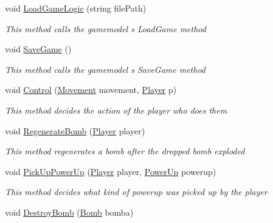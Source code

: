 \begin{DoxyCompactItemize}
void \mbox{\hyperlink{class_bomberman_1_1_business_logic_1_1_game_logic_a457b06be2502ed585fe15f6dcd5bc367}{Load\+Game\+Logic}} (string file\+Path)
\begin{DoxyCompactList}\small\item\em This method calls the gamemodel s Load\+Game method \end{DoxyCompactList}\item 
void \mbox{\hyperlink{class_bomberman_1_1_business_logic_1_1_game_logic_a8b8614ef81f7bf80f46384cc1f440ded}{Save\+Game}} ()
\begin{DoxyCompactList}\small\item\em This method calls the gamemodel s Save\+Game method \end{DoxyCompactList}\item 
void \mbox{\hyperlink{class_bomberman_1_1_business_logic_1_1_game_logic_a452baa5a3f7c27d25e2b3c1d0212596e}{Control}} (\mbox{\hyperlink{namespace_bomberman_1_1_business_logic_1_1_enum_ae31d051394d251f13cbd72f883375601}{Movement}} movement, \mbox{\hyperlink{class_bomberman_1_1_model_1_1_player}{Player}} p)
\begin{DoxyCompactList}\small\item\em This method decides the action of the player who does them \end{DoxyCompactList}\item 
void \mbox{\hyperlink{class_bomberman_1_1_business_logic_1_1_game_logic_adb1ba7ad7f4a7e7b0d32c2bc6b312ac1}{Regenerate\+Bomb}} (\mbox{\hyperlink{class_bomberman_1_1_model_1_1_player}{Player}} player)
\begin{DoxyCompactList}\small\item\em This method regenerates a bomb after the dropped bomb exploded \end{DoxyCompactList}\item 
void \mbox{\hyperlink{class_bomberman_1_1_business_logic_1_1_game_logic_a65a7db93dd325490214d760117bca632}{Pick\+Up\+Power\+Up}} (\mbox{\hyperlink{class_bomberman_1_1_model_1_1_player}{Player}} player, \mbox{\hyperlink{namespace_bomberman_1_1_model_a698c97744bc885fe16cc6f385fc501ef}{Power\+Up}} powerup)
\begin{DoxyCompactList}\small\item\em This method decides what kind of powerup was picked up by the player \end{DoxyCompactList}\item 
void \mbox{\hyperlink{class_bomberman_1_1_business_logic_1_1_game_logic_aa228edcc60791fba9e3a8495f1c6ee63}{Destroy\+Bomb}} (\mbox{\hyperlink{class_bomberman_1_1_model_1_1_bomb}{Bomb}} bomba)

\end{DoxyCompactItemize}

